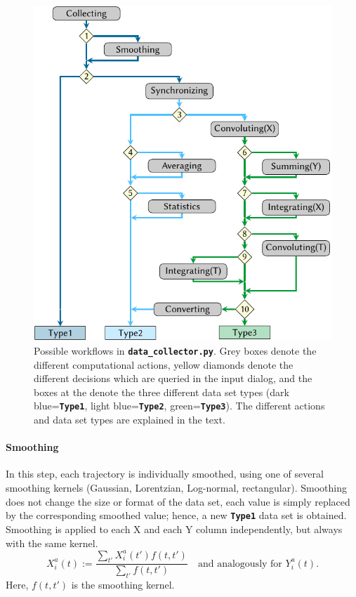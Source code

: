 \documentclass[a4paper,10pt,DIV=15,openany,twoside=false]{scrbook}
\newcommand{\todo}[1]{\textcolor{RL}{#1}}
\newcommand{\ttt}[1]{\textbf{\texttt{#1}}}
\begin{document}
\begin{figure}[htb]
  \centering
  \includegraphics[scale=1]{img/data_collector/data_collector.pdf}
  \caption[Possible workflows in \ttt{data\_collector.py}. ]{
  Possible workflows in \ttt{data\_collector.py}. 
  Grey boxes denote the different computational actions, yellow diamonds denote the different decisions which are queried in the input dialog, and the boxes at the denote the three different data set types (dark blue=\ttt{Type1}, light blue=\ttt{Type2}, green=\ttt{Type3}).
  The different actions and data set types are explained in the text.
  }
  \label{fig:data_collector}
\end{figure}

\paragraph{Smoothing}

In this step, each trajectory is individually smoothed, using one of several smoothing kernels (Gaussian, Lorentzian, Log-normal, rectangular). 
Smoothing does not change the size or format of the data set, each value is simply replaced by the corresponding smoothed value; hence, a new \ttt{Type1} data set is obtained.
Smoothing is applied to each X and each Y column independently, but always with the same kernel.
\begin{equation}
  X^a_i(t):=\frac{\sum_{t'}X^a_i(t') f(t,t')}{\sum_{t'}f(t,t')}\quad\text{and analogously for $Y_i^a(t)$.}
\end{equation}
Here, $f(t,t')$ is the smoothing kernel.
\end{document}
